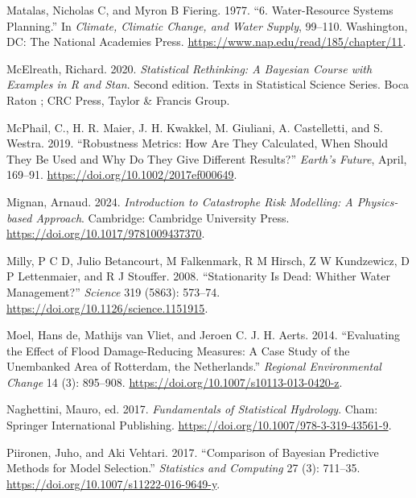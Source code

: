 \documentclass[
  letterpaper,
  DIV=11,
  numbers=noendperiod]{scrreprt}
\newlength{\cslhangindent}
\newenvironment{CSLReferences}[2] %
 {\begin{list}{}{%
  \setlength{\itemindent}{0pt}
  \setlength{\leftmargin}{0pt}
  \setlength{\parsep}{0pt}
  \ifodd #1
   \setlength{\leftmargin}{\cslhangindent}
   \setlength{\itemindent}{-1\cslhangindent}
  \fi
  \setlength{\itemsep}{#2\baselineskip}}}
 {\end{list}}
\begin{document}
\begin{CSLReferences}{1}{0}
Matalas, Nicholas C, and Myron B Fiering. 1977. {``6. {Water-Resource
Systems Planning}.''} In \emph{Climate, {Climatic Change}, and {Water
Supply}}, 99--110. Washington, DC: The National Academies Press.
\url{https://www.nap.edu/read/185/chapter/11}.

McElreath, Richard. 2020. \emph{Statistical Rethinking: A {Bayesian}
Course with Examples in {R} and {Stan}}. Second edition. Texts in
Statistical Science Series. Boca Raton ; CRC Press, Taylor \& Francis
Group.

McPhail, C., H. R. Maier, J. H. Kwakkel, M. Giuliani, A. Castelletti,
and S. Westra. 2019. {``Robustness Metrics: How Are They Calculated,
When Should They Be Used and Why Do They Give Different Results?''}
\emph{Earth's Future}, April, 169--91.
\url{https://doi.org/10.1002/2017ef000649}.

Mignan, Arnaud. 2024. \emph{Introduction to {Catastrophe Risk
Modelling}: {A Physics-based Approach}}. Cambridge: Cambridge University
Press. \url{https://doi.org/10.1017/9781009437370}.

Milly, P C D, Julio Betancourt, M Falkenmark, R M Hirsch, Z W
Kundzewicz, D P Lettenmaier, and R J Stouffer. 2008. {``Stationarity Is
Dead: Whither Water Management?''} \emph{Science} 319 (5863): 573--74.
\url{https://doi.org/10.1126/science.1151915}.

Moel, Hans de, Mathijs van Vliet, and Jeroen C. J. H. Aerts. 2014.
{``Evaluating the Effect of Flood Damage-Reducing Measures: A Case Study
of the Unembanked Area of {Rotterdam}, the {Netherlands}.''}
\emph{Regional Environmental Change} 14 (3): 895--908.
\url{https://doi.org/10.1007/s10113-013-0420-z}.

Naghettini, Mauro, ed. 2017. \emph{Fundamentals of {Statistical
Hydrology}}. Cham: Springer International Publishing.
\url{https://doi.org/10.1007/978-3-319-43561-9}.

Piironen, Juho, and Aki Vehtari. 2017. {``Comparison of {Bayesian}
Predictive Methods for Model Selection.''} \emph{Statistics and
Computing} 27 (3): 711--35.
\url{https://doi.org/10.1007/s11222-016-9649-y}.


\end{CSLReferences}
\end{document}
